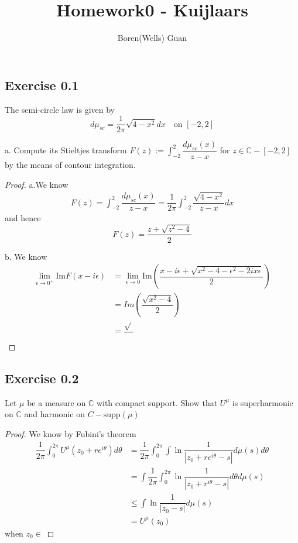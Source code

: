 \documentclass[lang=en,11pt,a4paper,citestyle =authoryear]{elegantpaper}
\title{Homework0 - Kuijlaars}
\author{Boren(Wells) Guan}
\newcommand{\C}{\mathbb{C}}
\begin{document}
\maketitle

\subsection*{Exercise 0.1} The semi-circle law is given by
\[
d\mu_{sc} = \dfrac{1}{2\pi}\sqrt{4-x^2}dx\quad\text{on }[-2,2]
\]\par
a. Compute its Stieltjes transform $F(z):=\int_{-2}^2 \dfrac{d\mu_{sc}(x)}{z-x}$ for $z \in \C-[-2,2]$ by the means of contour integration.
\begin{proof}
a.We know
\[
\begin{aligned}
    F(z) = \int_{-2}^2 \dfrac{d\mu_{sc}(x)}{z-x} = \dfrac{1}{2\pi}\int_{-2}^2 \dfrac{\sqrt{4-x^2}}{z-x}dx
\end{aligned}
\]
and hence
\[
F(z) = \dfrac{z+\sqrt{z^2-4}}{2}
\]\par
b. We know
\[
\begin{aligned}
\lim_{\epsilon\to 0^+}\text{Im}F(x-i\epsilon) &= \lim_{\epsilon \to 0}\text{Im}\left(\dfrac{x-i\epsilon+\sqrt{x^2-4-\epsilon^2-2ix\epsilon}}{2}\right) \\
&= Im\left(\dfrac{\sqrt{x^2-4}}{2}\right) \\
& = \dfrac{\sqrt{}{}}{}
\end{aligned}
\]
\end{proof}

\subsection*{Exercise 0.2} Let $\mu$ be a measure on $\C$ with compact support. Show that $U^{\mu}$ is superharmonic on $\C$ and harmonic on $C - \text{supp}(\mu)$
\begin{proof}
We know by Fubini's theorem
\[
\begin{aligned}
\dfrac{1}{2\pi}\int_0^{2\pi}U^{\mu}(z_0+re^{i\theta})d\theta &= \dfrac{1}{2\pi} \int_0^{2\pi}\int \ln\dfrac{1}{|z_0+re^{i\theta}-s|}d\mu(s)d\theta \\
& = \int \dfrac{1}{2\pi} \int_0^{2\pi}\ln\dfrac{1}{|z_0+r^{i\theta} - s|}d\theta d\mu(s) \\
& \leq \int \ln \dfrac{1}{|z_0-s|} d\mu(s) \\ & = U^{\mu}(z_0)
\end{aligned}
\]
when $z_0 \in$
\end{proof}
\end{document}
